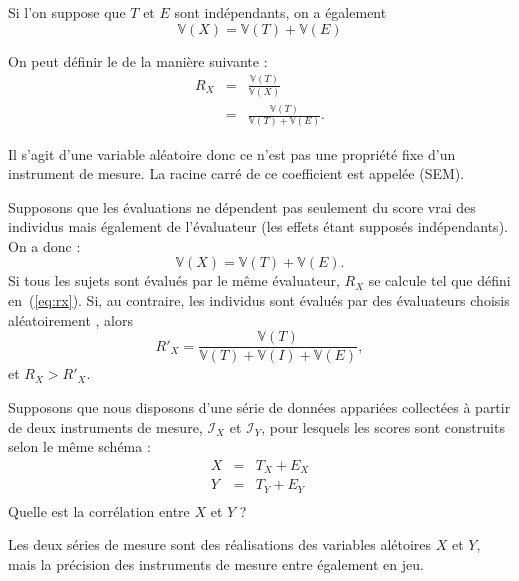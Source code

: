 Si l'on suppose que $T$ et $E$ sont indépendants, on a également
\[
\mathbb{V}(X) = \mathbb{V}(T)+\mathbb{V}(E)
\]

\foilhead{}
On peut définir le  de la manière suivante :
\begin{eqnarray}\label{eq:rx}
  R_X & = & \frac{\mathbb{V}(T)}{\mathbb{V}(X)}\nonumber\\
      & = & \frac{\mathbb{V}(T)}{\mathbb{V}(T)+\mathbb{V}(E)}.
\end{eqnarray}

Il s'agit d'une variable aléatoire donc ce n'est pas une propriété fixe d'un
instrument de mesure. La racine carré de ce coefficient est appelée
 (SEM).

Supposons que les évaluations ne dépendent pas seulement du score vrai des
individus mais également de l'évaluateur (les effets étant supposés
indépendants). On a donc :
\[
\mathbb{V}(X) = \mathbb{V}(T)+\mathbb{V}(E).
\]
Si tous les sujets sont évalués par le même évaluateur, $R_X$ se calcule tel que
défini en~(\ref{eq:rx}). Si, au contraire, les individus sont évalués par des
évaluateurs choisis aléatoirement , alors
\begin{equation}\label{eq:rxprime}
    R'_X=\frac{\mathbb{V}(T)}{\mathbb{V}(T)+\mathbb{V}(I)+\mathbb{V}(E)},
\end{equation}
et $R_X^{}>R'_X$.

Supposons que nous disposons d'une série de données appariées collectées à
partir de deux instruments de mesure, $\mathcal{I}_X$ et $\mathcal{I}_Y$, pour
lesquels les scores sont construits selon le même schéma :
\begin{eqnarray*}
	X & = & T_X+E_X\\
	Y & = & T_Y+E_Y\\
\end{eqnarray*}
Quelle est la corrélation entre $X$ et $Y$ ?

Les\mark{} deux séries de mesure sont des réalisations des variables alétoires
$X$ et $Y$, mais la précision des instruments de mesure entre également en jeu.


